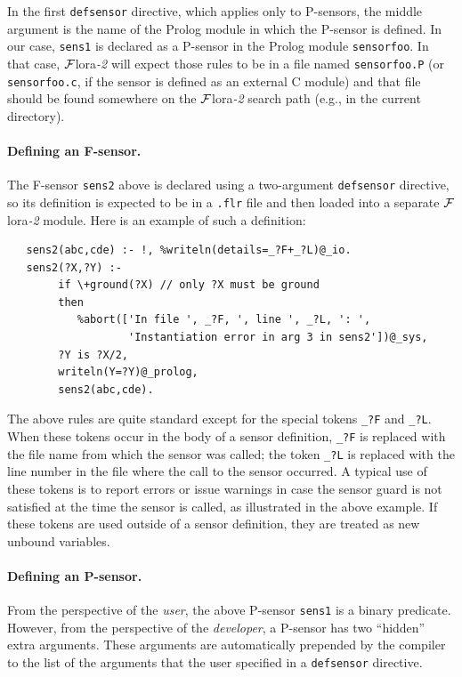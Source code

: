 \documentclass[11pt]{article}
\newcommand{\FLORA}{{\mbox{\sc ${\cal F}${lora}\rm\emph{-2}}}\xspace}
\begin{document}
In the first \texttt{defsensor} directive, which applies only to P-sensors,
the middle argument is the name
of the Prolog module in which the P-sensor is defined. 
In our case, \texttt{sens1} is declared as a P-sensor
in the Prolog module \texttt{sensorfoo}. In that case, \FLORA
will expect those rules to be in a file named \texttt{sensorfoo.P}
(or \texttt{sensorfoo.c}, if the sensor is defined as an external C module)
and that file should be found somewhere on the \FLORA search path (e.g., in
the current directory).

\paragraph{Defining an F-sensor.}
The F-sensor \texttt{sens2} above is declared using a
two-argument \texttt{defsensor}  directive, so its definition is expected to be in a
\texttt{.flr} file and then loaded into a separate \FLORA module.
Here is an example of such a definition:
\begin{verbatim}
   sens2(abc,cde) :- !, %writeln(details=_?F+_?L)@_io.
   sens2(?X,?Y) :-
        if \+ground(?X) // only ?X must be ground
        then
           %abort(['In file ', _?F, ', line ', _?L, ': ',
                   'Instantiation error in arg 3 in sens2'])@_sys,
        ?Y is ?X/2,
        writeln(Y=?Y)@_prolog,
        sens2(abc,cde).
\end{verbatim}
The above rules are quite standard except for the special tokens
\texttt{\_?F} and \texttt{\_?L}. When these tokens occur in the body of a
sensor definition, \texttt{\_?F} is replaced with the file name from which
the sensor was called; the token \texttt{\_?L} is replaced with the line
number in the file where the call to the sensor occurred.
A typical use of these tokens is to report errors or issue warnings in case
the sensor guard is not satisfied at the time the sensor is called, as
illustrated in the above example.
If these tokens are used outside of a sensor definition, they are treated
as new unbound variables.

\paragraph{Defining an P-sensor.}
From the perspective of the \emph{user}, the above P-sensor
\texttt{sens1} is
a binary predicate. However, 
from the perspective of the \emph{developer}, a P-sensor has two
``hidden'' extra arguments. These arguments 
are automatically prepended by the compiler to the list of the arguments
that the user specified in a \texttt{defsensor} directive. 
\end{document}

